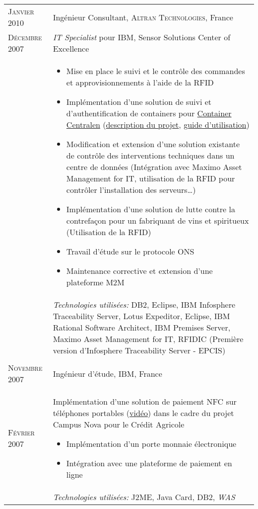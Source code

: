 \begin{longtable}{R{2.5cm}|p{14.8cm}}
 	\textsc{Janvier 2010} & Ingénieur Consultant, \textsc{Altran Technologies}, France\\
 	\textsc{Décembre 2007}& \emph{IT Specialist} pour IBM, Sensor Solutions Center of Excellence\\&
 	\footnotesize{
 		\begin{itemize}
 		  \item Mise en place le suivi et le contrôle des commandes et approvisionnements à l'aide de la RFID
 		  \item Implémentation d'une solution de suivi et d'authentification de containers pour \href{http://www.container-centralen.com/}{Container Centralen} (\href{http://www.container-centralen.co.uk/rfid/history.aspx}{description du projet}, \href{http://www.container-centralen.co.uk/rfid/user\%20guide\%20for\%20scanning.aspx}{guide d'utilisation})
 		  \item Modification et extension d'une solution existante de contrôle des interventions techniques dans un centre de données 
 	 	(Intégration avec Maximo Asset Management for IT, utilisation de la RFID pour contrôler l'installation des serveurs\ldots)
 	 	  \item Implémentation d'une solution de lutte contre la contrefaçon pour un fabriquant de vins et spiritueux (Utilisation de la RFID)
 	 	  \item Travail d'étude sur le protocole ONS
 	 	  \item Maintenance corrective et extension d'une plateforme M2M
 		\end{itemize}
 		\vspace{-1em}
 	}\\&
 	\footnotesize{\emph{Technologies utilisées:} DB2, Eclipse, IBM Infosphere Traceability Server, Lotus Expeditor, Eclipse, 
 	IBM Rational Software Architect, IBM Premises Server, Maximo Asset Management for IT, RFIDIC (Première version d'Infosphere Traceability Server - EPCIS) }\\
 \\
 	\textsc{Novembre 2007} & Ingénieur d'étude, \textsc{IBM}, France \\
 	\textsc{Février 2007}&
 	\footnotesize{
 	 	Implémentation d'une solution de paiement NFC sur téléphones portables (\href{http://www.nouvo.ch/s-007}{vidéo}) 
 	 	dans le cadre du projet Campus Nova pour le Crédit Agricole
 	 	\begin{itemize}
 	 	  \item Implémentation d'un porte monnaie électronique
 	 	  \item Intégration avec une plateforme de paiement en ligne
 	 	\end{itemize}
 	 	
	}\\&
	\vspace{-1em}
 	\footnotesize{\emph{Technologies utilisées:} J2ME, Java Card, DB2, \emph{WAS}}\\
\end{longtable}